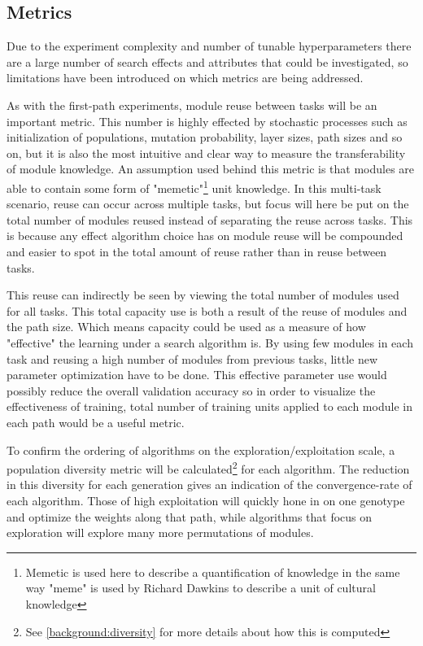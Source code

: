 \subsection{Metrics}\label{exp2:metrics}
Due to the experiment complexity and number of tunable hyperparameters there are a large number of search effects and attributes that could be investigated, so limitations have been introduced on which metrics are being addressed. 

As with the first-path experiments, module reuse between tasks will be an important metric. This number is highly effected by stochastic processes such as initialization of populations, mutation probability, layer sizes, path sizes and so on, but it is also the most intuitive and clear way to measure the transferability of module knowledge. An assumption used behind this metric is that modules are able to contain some form of "memetic"\footnote{Memetic is used here to describe a quantification of knowledge in the same way "meme" is used by Richard Dawkins\cite{selfishGene} to describe a unit of cultural knowledge} unit knowledge. In this multi-task scenario, reuse can occur across multiple tasks, but focus will here be put on the total number of modules reused instead of separating the reuse across tasks. This is because any effect algorithm choice has on module reuse will be compounded and easier to spot in the total amount of reuse rather than in reuse between tasks.

This reuse can indirectly be seen by viewing the total number of modules used for all tasks. This total capacity use is both a result of the reuse of modules and the path size. Which means capacity could be used as a measure of how "effective" the learning under a search algorithm is. By using few modules in each task and reusing a high number of modules from previous tasks, little new parameter optimization have to be done. This effective parameter use would possibly reduce the overall validation accuracy so in order to visualize the effectiveness of training, total number of training units applied to each module in each path would be a useful metric. 

To confirm the ordering of algorithms on the exploration/exploitation scale, a population diversity metric will be calculated\footnote{See \ref{background:diversity} for more details about how this is computed} for each algorithm. The reduction in this diversity for each generation gives an indication of the convergence-rate of each algorithm. Those of high exploitation will quickly hone in on one genotype and optimize the weights along that path, while algorithms that focus on exploration will explore many more permutations of modules. 

